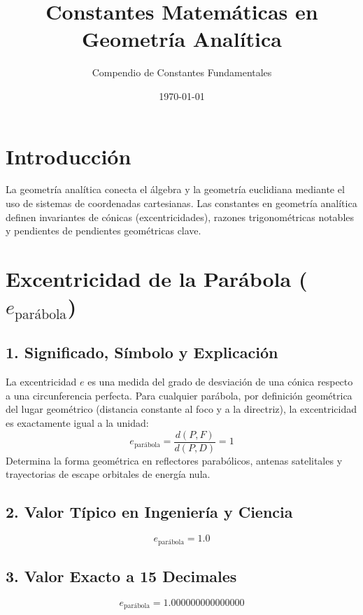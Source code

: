 \documentclass[12pt,a4paper]{article}
\title{\textbf{Constantes Matemáticas en Geometría Analítica}}
\author{Compendio de Constantes Fundamentales}
\date{\today}
\begin{document}
\maketitle

\section*{Introducción}
La geometría analítica conecta el álgebra y la geometría euclidiana mediante el uso de sistemas de coordenadas cartesianas. Las constantes en geometría analítica definen invariantes de cónicas (excentricidades), razones trigonométricas notables y pendientes de pendientes geométricas clave.

\section{Excentricidad de la Parábola ($e_{\text{parábola}}$)}

\subsection*{1. Significado, Símbolo y Explicación}
La excentricidad $e$ es una medida del grado de desviación de una cónica respecto a una circunferencia perfecta. Para cualquier parábola, por definición geométrica del lugar geométrico (distancia constante al foco y a la directriz), la excentricidad es exactamente igual a la unidad:
\begin{equation*}
e_{\text{parábola}} = \frac{d(P, F)}{d(P, D)} = 1
\end{equation*}
Determina la forma geométrica en reflectores parabólicos, antenas satelitales y trayectorias de escape orbitales de energía nula.

\subsection*{2. Valor Típico en Ingeniería y Ciencia}
\begin{equation*}
e_{\text{parábola}} = 1.0
\end{equation*}

\subsection*{3. Valor Exacto a 15 Decimales}
\begin{equation*}
e_{\text{parábola}} = 1.000000000000000
\end{equation*}
\end{document}
